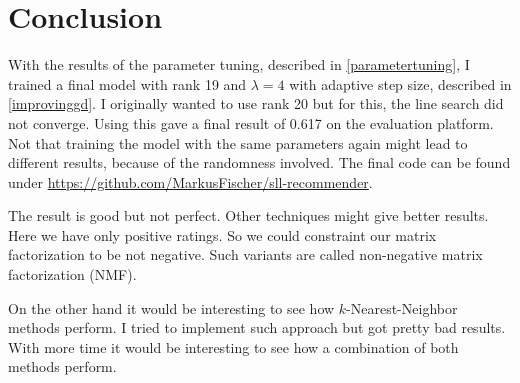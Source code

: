 \documentclass[DIV=14,twocolumn]{scrartcl}
\begin{document}
\section{Conclusion}
With the results of the parameter tuning, described in \autoref{parametertuning}, I trained a final model with rank 19 and $\lambda=4$ with adaptive step size, described in \autoref{improvinggd}. I originally wanted to use rank 20 but for this, the line search did not converge. 
Using this gave a final result of 0.617 on the evaluation platform. Not that training the model with the same parameters again might lead to different results, because of the randomness involved. The final code can be found under \url{https://github.com/MarkusFischer/sll-recommender}. 

The result is good but not perfect. Other techniques might give better results. Here we have only positive ratings. So we could constraint our matrix factorization to be not negative. Such variants are called non-negative matrix factorization (NMF).

On the other hand it would be interesting to see how $k$-Nearest-Neighbor methods perform. I tried to implement such approach but got pretty bad results. With more time it would be interesting to see how a combination of both methods perform.

{}

\end{document}
